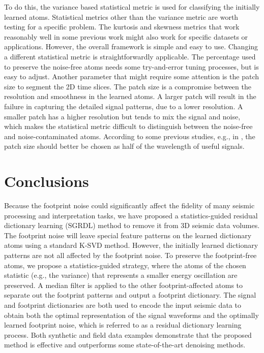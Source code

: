  To do this, the variance based statistical metric is used for classifying the initially learned atoms. Statistical metrics other than the variance metric are worth testing for a specific problem. The kurtosis and skewness metrics that work reasonably well in some previous work \cite{yatong2021} might also work for specific datasets or applications. However, the overall framework is simple and easy to use. Changing a different statistical metric is straightforwardly applicable. The percentage used to preserve the noise-free atoms needs some try-and-error tuning processes, but is easy to adjust. Another parameter that might require some attention is the patch size to segment the 2D time slices. The patch size is a compromise between the resolution and smoothness in the learned atoms. A larger patch will result in the failure in capturing the detailed signal patterns, due to a lower resolution. A smaller patch has a higher resolution but tends to mix the signal and noise, which makes the statistical metric difficult to distinguish between the noise-free and noise-contaminated atoms. According to some previous studies, e.g., in \cite{guoyin2018,yangkang2019srl}, the patch size should better be chosen as half of the wavelength of useful signals. 




 
%
%


\section{Conclusions}
Because the footprint noise could significantly affect the fidelity of many seismic processing and interpretation tasks, we have proposed a statistics-guided residual dictionary learning (SGRDL) method to remove it from 3D seismic data volumes. The footprint noise will leave special feature patterns on the learned dictionary atoms using a standard K-SVD method. However, the initially learned dictionary patterns are not all affected by the footprint noise. To preserve the footprint-free atoms, we propose a statistics-guided strategy, where the atoms  of the chosen statistic (e.g., the variance) that represents a smaller energy oscillation are preserved. A median filter is applied to the other footprint-affected atoms to separate out the footprint patterns and output a footprint dictionary. The signal and footprint dictionaries are both used to encode the input seismic data to obtain both the optimal representation of the signal waveforms and the optimally learned footprint noise, which is referred to as a residual dictionary learning process. Both synthetic and field data examples demonstrate that the proposed method is effective and outperforms some state-of-the-art denoising methods. 

